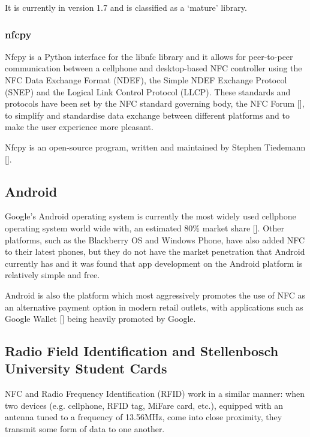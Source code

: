It is currently in version 1.7 and is classified as a `mature' library. 

\subsubsection{nfcpy}
\label{sec:nfcpy}

Nfcpy is a Python interface for the libnfc library and it allows for peer-to-peer communication
between a cellphone and desktop-based NFC controller using the NFC Data Exchange Format
(NDEF), the Simple NDEF Exchange Protocol (SNEP) and the Logical Link Control Protocol (LLCP).
These standards and protocols have been set by the NFC standard governing body, the NFC Forum
[\cite{website:nfc-forum}], to simplify and standardise data exchange between different
platforms and to make the user experience more pleasant.

Nfcpy is an open-source program, written and maintained by Stephen Tiedemann
[\cite{website:nfcpy}].

\subsection{Android}

Google's Android operating system is currently the most widely used cellphone operating
system world wide with, an estimated 80\% market share
[\cite{article:android-marketshare}].
Other platforms, such as the Blackberry OS and Windows Phone, have also added NFC to their
latest phones, but they do not have the market penetration that Android currently has and it
was found that app development on the Android platform is relatively simple and free.

Android is also the platform which most aggressively promotes the use of NFC as an alternative 
payment option in modern retail outlets, with applications such as Google Wallet
[\cite{article:android-wallet}] being heavily promoted by Google.

\subsection{Radio Field Identification and Stellenbosch
University Student Cards}

NFC and Radio Frequency Identification (RFID) work in a similar manner: when two
devices  (e.g. cellphone, RFID tag, MiFare card, etc.), equipped with an antenna tuned to a
frequency  of 13.56MHz, come into close proximity, they transmit some form of data to one another.


